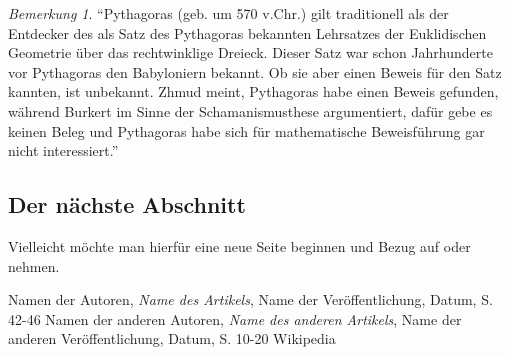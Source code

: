 \documentclass[a4paper]{article}
\theoremstyle{definition}
\theoremstyle{remark}
\newtheorem*{remark}{Bemerkung}
\begin{document}
	\begin{remark} ``Pythagoras (geb. um 570 v.Chr.) gilt traditionell als der Entdecker des als Satz des Pythagoras bekannten Lehrsatzes der Euklidischen Geometrie über das rechtwinklige Dreieck. Dieser Satz war schon Jahrhunderte vor Pythagoras den Babyloniern bekannt. Ob sie aber einen Beweis für den Satz kannten, ist unbekannt. Zhmud meint, Pythagoras habe einen Beweis gefunden, während Burkert im Sinne der Schamanismusthese argumentiert, dafür gebe es keinen Beleg und Pythagoras habe sich für mathematische Beweisführung gar nicht interessiert.'' \cite{WIKI}
	\end{remark}
	

	
	\subsection{Der nächste Abschnitt}
	Vielleicht möchte man hierfür eine neue Seite beginnen und Bezug auf \cite{einequelle} oder \cite{eineanderequelle}
	nehmen.
	
		\newpage
	
	\begin{thebibliography}{2}
		 Namen der Autoren, \textit{Name des Artikels}, Name der Veröffentlichung, Datum, S. 42-46
		 Namen der anderen Autoren, \textit{Name des anderen Artikels}, Name der anderen Veröffentlichung, Datum, S. 10-20
		 Wikipedia
	\end{thebibliography}
\end{document}
